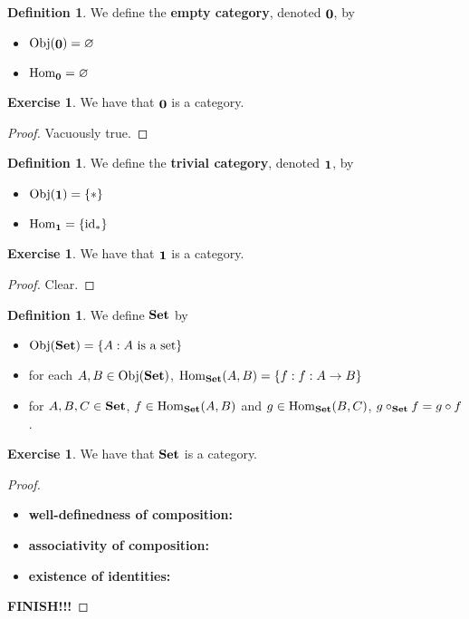 \documentclass{book}
\theoremstyle{definition}
\newtheorem{defn}[definition]{Definition}
\newtheorem{ex}[definition]{Exercise}
\newcommand{\lex}[1]{\label{ex:#1}}
\newcommand{\ld}[1]{\label{defn:#1}}
\DeclareMathOperator{\id}{id}
\DeclareMathOperator{\Obj}{Obj}
\DeclareMathOperator{\Hom}{Hom}
\DeclareMathOperator*{\Set}{\text{\tbf{Set}}}
\DeclareMathOperator*{\0}{\mbf{0}}
\DeclareMathOperator*{\1}{\mbf{1}}
\newcommand{\tbf}[1]{\textbf{#1}}
\begin{document}
	\begin{defn} \ld{12001.1}
		We define the \textbf{empty category}, denoted $\0$, by 
		\begin{itemize}
			\item $\Obj(\0) = \varnothing$
			\item $\Hom_{\0} = \varnothing$
		\end{itemize}
	\end{defn}

	\begin{ex} \lex{12001.2}
		We have that $\0$ is a category.
	\end{ex}
	
	\begin{proof}
		Vacuously true.
	\end{proof}

	\begin{defn} \ld{12001.}
		We define the \textbf{trivial category}, denoted $\1$, by 
		\begin{itemize}
			\item $\Obj(\1) = \{*\}$
			\item $\Hom_{\1} = \{\id_*\}$
		\end{itemize}
	\end{defn}

	\begin{ex} \lex{12001.}
		We have that $\1$ is a category.
	\end{ex}

	\begin{proof}
		Clear.
	\end{proof}
	
	\begin{defn} \ld{12001.}
		We define $\Set$ by  
		\begin{itemize}
			\item $\Obj(\Set) = \{A: A \text{ is a set}\}$ 
			\item for each $A,B \in \Obj(\Set)$, $\Hom_{\Set}(A,B) = \{f: f:A \rightarrow B\}$
			\item for $A, B, C \in \Set$, $f \in \Hom_{\Set}(A, B)$ and $g \in \Hom_{\Set}(B, C)$, $g \circ_{\Set} f = g \circ f$. 
		\end{itemize}
	\end{defn}

	\begin{ex} \lex{12001.}
		We have that $\Set$ is a category.
	\end{ex}

	\begin{proof}\
		\begin{itemize}
			\item \tbf{well-definedness of composition:}
			\item \tbf{associativity of composition:} 
			\item \tbf{existence of identities:} 
		\end{itemize}
		\tbf{FINISH!!!}
	\end{proof}
	
\end{document}
